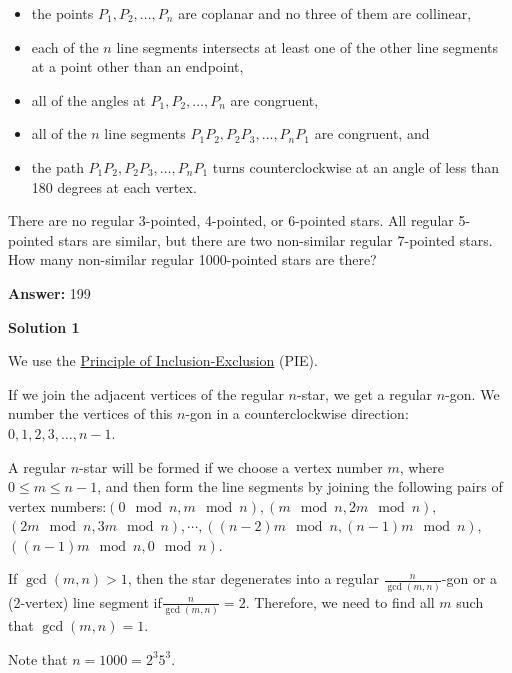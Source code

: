 \begin{enumerate}
 
            \begin{itemize}
        \item the points $P_1, P_2,\ldots, P_n$ are coplanar and no three of them are collinear,

        \item each of the $n$ line segments intersects at least one of the other line segments at a point other than an endpoint,

        \item all of the angles at $P_1, P_2,\ldots, P_n$ are congruent,

        \item all of the $n$ line segments $P_1P_2, P_2P_3,\ldots, P_nP_1$ are congruent, and

        \item the path $P_1P_2, P_2P_3,\ldots, P_nP_1$ turns counterclockwise at an angle of less than 180 degrees at each vertex.
            \end{itemize}
            There are no regular 3-pointed, 4-pointed, or 6-pointed stars. All regular 5-pointed stars are similar, but there are two non-similar regular 7-pointed stars. How many non-similar regular 1000-pointed stars are there?


 
 \textbf{Answer: }199



\textbf{Solution 1}

We use the \href{https://artofproblemsolving.com/wiki/index.php?title=Principle\_of\_Inclusion-Exclusion}{Principle of Inclusion-Exclusion} (PIE).

 If we join the adjacent vertices of the  regular $n$-star, we get a regular $n$-gon. We number the vertices of this $n$-gon in a counterclockwise direction: $0, 1, 2, 3, \ldots, n-1.$

 A regular $n$-star will be formed if we choose a vertex number $m$, where $0 \le m \le n-1$, and then form the line segments by joining the following pairs of vertex numbers:$(0 \mod{n}, m \mod{n}),$$(m \mod{n}, 2m \mod{n}),$$(2m \mod{n}, 3m \mod{n}),$$\cdots,$$((n-2)m \mod{n}, (n-1)m \mod{n}),$$((n-1)m \mod{n}, 0 \mod{n}).$

 If $\gcd(m,n) > 1$, then the star degenerates into a regular $\frac{n}{\gcd(m,n)}$-gon or a (2-vertex) line segment if$\frac{n}{\gcd(m,n)}= 2$. Therefore, we need to find all $m$ such that $\gcd(m,n) = 1$.

 Note that $n = 1000 = 2^{3}5^{3}.$


\end{enumerate}
